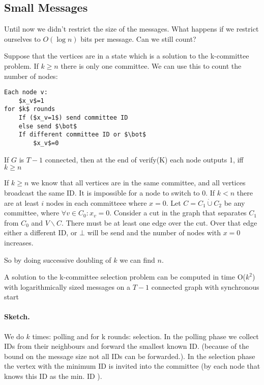\subsection{Small Messages}

Until now we didn't restrict the size of the messages. What happens if we restrict ourselves to $O(\log n)$ bits per message. Can we still count?

Suppose that the vertices are in a state which is a solution to the k-committee problem. If $k\geq n$ there is only one committee. We can use this to count the number of nodes:

\begin{lstlisting}
Each node v:
	$x_v$=1
for $k$ rounds
	If ($x_v=1$) send committee ID
	else send $\bot$
	If different committee ID or $\bot$
		$x_v$=0
\end{lstlisting}

\begin{lem} If $G$ is $T-1$ connected, then at the end of verify(K) each node outputs 1, iff $k\geq n$\end{lem}
\begin{pr} If $k\geq n$ we know that all vertices are in the same committee, and all vertices broadcast the same ID. It is impossible for a node to switch to $0$. If $k<n$ there are at least $i$ nodes in each committeee where $x=0$. Let $C = C_1 \dot \cup C_2$ be any committee, where $\forall v\in C_0: x_v=0$. Consider a cut in the graph that separates $C_1$ from $C_0$ and $V\backslash C$. There must be at least one edge over the cut. Over that edge either a different ID, or $\bot$ will be send and the number of nodes with $x=0$ increases.
\end{pr}

So by doing successive doubling of $k$ we can find $n$.

\begin{thm} A solution to the k-committee selection problem can be computed in time O($k^2$) with logarithmically sized messages on a $T-1$ connected graph with synchronous start\end{thm}

\paragraph{Sketch.} We do $k$ times: polling and for k rounds: selection. In the polling phase we collect IDs from their neighbours and forward the smallest known ID. (because of the bound on the message size not all IDs can be forwarded.). In the selection phase the vertex with the minimum ID is invited into the committee (by each node that knows this ID as the min. ID	).
